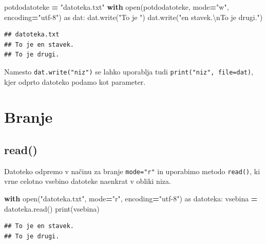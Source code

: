 \documentclass[
]{report}
\newenvironment{Shaded}{\begin{snugshade}}{\end{snugshade}}
\newcommand{\BuiltInTok}[1]{#1}
\newcommand{\CharTok}[1]{\textcolor[rgb]{0.31,0.60,0.02}{#1}}
\newcommand{\ControlFlowTok}[1]{\textcolor[rgb]{0.13,0.29,0.53}{\textbf{#1}}}
\newcommand{\ImportTok}[1]{#1}
\newcommand{\NormalTok}[1]{#1}
\newcommand{\OperatorTok}[1]{\textcolor[rgb]{0.81,0.36,0.00}{\textbf{#1}}}
\newcommand{\StringTok}[1]{\textcolor[rgb]{0.31,0.60,0.02}{#1}}
\begin{document}
\begin{Shaded}
\begin{Highlighting}[]
\NormalTok{potdodatoteke }\OperatorTok{=} \StringTok{"datoteka.txt"}
\ControlFlowTok{with} \BuiltInTok{open}\NormalTok{(potdodatoteke, mode}\OperatorTok{=}\StringTok{"w"}\NormalTok{, encoding}\OperatorTok{=}\StringTok{"utf{-}8"}\NormalTok{) }\ImportTok{as}\NormalTok{ dat:}
\NormalTok{    dat.write(}\StringTok{"To je "}\NormalTok{)}
\NormalTok{    dat.write(}\StringTok{"en stavek.}\CharTok{\textbackslash{}n}\StringTok{To je drugi."}\NormalTok{)}
\end{Highlighting}
\end{Shaded}

\begin{verbatim}
## datoteka.txt
## To je en stavek.
## To je drugi.
\end{verbatim}

Namesto \texttt{dat.write("niz")} se lahko uporablja tudi \texttt{print("niz",\ file=dat)}, kjer
odprto datoteko podamo kot parameter.

\hypertarget{branje}{%
\section{Branje}\label{branje}}

\hypertarget{read}{%
\subsection{read()}\label{read}}

Datoteko odpremo v načinu za branje \texttt{mode="r"} in uporabimo metodo \texttt{read()},
ki vrne celotno vsebino datoteke naenkrat v obliki niza.

\begin{Shaded}
\begin{Highlighting}[]
\ControlFlowTok{with} \BuiltInTok{open}\NormalTok{(}\StringTok{"datoteka.txt"}\NormalTok{, mode}\OperatorTok{=}\StringTok{"r"}\NormalTok{, encoding}\OperatorTok{=}\StringTok{"utf{-}8"}\NormalTok{) }\ImportTok{as}\NormalTok{ datoteka:}
\NormalTok{    vsebina }\OperatorTok{=}\NormalTok{ datoteka.read()}
\BuiltInTok{print}\NormalTok{(vsebina)}
\end{Highlighting}
\end{Shaded}

\begin{verbatim}
## To je en stavek.
## To je drugi.
\end{verbatim}
\end{document}
